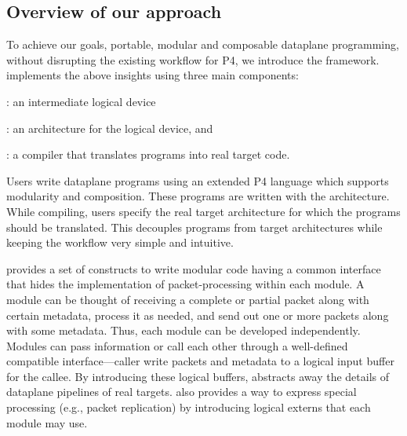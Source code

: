 \documentclass[letterpaper,twocolumn,10pt]{article}
\begin{document}
\subsection{Overview of our approach}
\label{sec:overview}

To achieve our goals, portable, modular and composable dataplane
programming, without disrupting the existing workflow for P4, we
introduce the \ulang framework. \ulang implements the above insights
using three main components:
\begin{enumerate*}[label=(\roman*)]
  \item \uswitch: an intermediate logical device
  \item \uarch: an architecture for the logical device, and
  \item \ucomp: a compiler that translates \ulang programs into real
    target code.
\end{enumerate*}

Users write dataplane programs using an extended P4 language which
supports modularity and composition. These programs are written with
the \uarch architecture. While compiling, users specify the real
target architecture for which the \ulang programs should be
translated. This decouples programs from target architectures while
keeping the workflow very simple and intuitive.


\uarch provides a set of constructs to write modular code having a
common interface that hides the implementation of packet-processing
within each module. A module can be thought of receiving a complete or
partial packet along with certain metadata, process it as needed, and
send out one or more packets along with some metadata. Thus, each
module can be developed independently. Modules can pass information or
call each other through a well-defined compatible interface---caller
write packets and metadata to a logical input buffer for the callee.
By introducing these logical buffers, \uswitch abstracts away the
details of dataplane pipelines of real targets. \uarch also provides a
way to express special processing (e.g., packet replication) by
introducing logical externs that each module may use.
\end{document}
